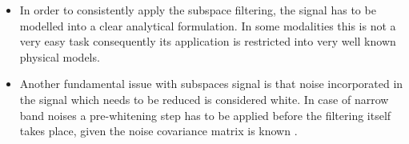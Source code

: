 \begin{itemize}
\item In order to consistently apply the subspace filtering, the signal has to be modelled into a clear analytical formulation. In some modalities this is not a very easy task consequently its application is restricted into very well known physical models.

\item Another fundamental issue with subspaces signal is that noise incorporated in the signal which needs to be reduced is considered white. In case of narrow band noises a pre-whitening step has to be applied before the filtering itself takes place, given the noise covariance matrix is known \cite{6}.

\end{itemize}
